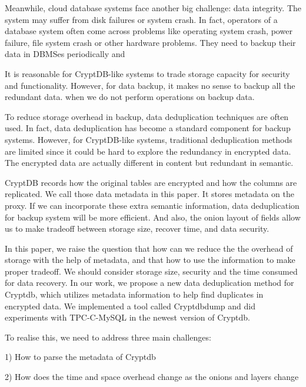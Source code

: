 Meanwhile, cloud database systems face another big challenge: data integrity. The system may suffer from disk failures or system crash. In fact, operators of a database system often come across problems like operating system crash, power failure, file system crash or other hardware problems\citep{mysqlbackupdocumentation}. They need to backup their data in DBMSes periodically and  


It is reasonable for CryptDB-like systems to trade storage capacity for security and functionality. However, for data backup, it makes no sense to backup all the redundant data. when we do not perform operations on backup data.

To reduce storage overhead in backup, data deduplication techniques are often used. In fact, data deduplication has become a standard component for backup systems\citep{fu2015design}. However, for CryptDB-like systems, traditional deduplication methods are limited since it could be hard to explore the redundancy in encrypted data. The encrypted data are actually different in content but redundant in semantic. 

CryptDB records how the original tables are encrypted and how the columns are replicated. We call those data metadata in this paper. It stores metadata on the proxy. If we can incorporate these extra semantic information, data deduplication for backup system will be more efficient. And also, the onion layout of fields allow us to make tradeoff between storage size, recover time, and data security.


In this paper, we raise the question that how can we reduce the the overhead of storage with the help of metadata, and that how to use the information to make proper tradeoff. We should consider storage size, security and the time consumed for data recovery. In our work, we propose a new data deduplication method for Cryptdb, which utilizes metadata information to help find duplicates in encrypted data. We implemented a tool called Cryptdbdump and did experiments with TPC-C-MySQL in the newest version of Cryptdb.


To realise this, we need to address three main challenges:

1) How to parse the metadata of Cryptdb

2) How  does the time and space overhead change as the onions and layers change

